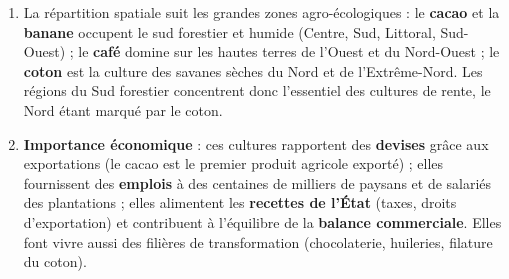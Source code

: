 \documentclass[11pt]{article}
\begin{document}
\begin{corrige}
\begin{enumerate}
\item La répartition spatiale suit les grandes zones agro-écologiques : le \textbf{cacao} et la \textbf{banane} occupent le sud forestier et humide (Centre, Sud, Littoral, Sud-Ouest) ; le \textbf{café} domine sur les hautes terres de l'Ouest et du Nord-Ouest ; le \textbf{coton} est la culture des savanes sèches du Nord et de l'Extrême-Nord. Les régions du Sud forestier concentrent donc l'essentiel des cultures de rente, le Nord étant marqué par le coton.
\item \textbf{Importance économique} : ces cultures rapportent des \textbf{devises} grâce aux exportations (le cacao est le premier produit agricole exporté) ; elles fournissent des \textbf{emplois} à des centaines de milliers de paysans et de salariés des plantations ; elles alimentent les \textbf{recettes de l'État} (taxes, droits d'exportation) et contribuent à l'équilibre de la \textbf{balance commerciale}. Elles font vivre aussi des filières de transformation (chocolaterie, huileries, filature du coton).
\end{enumerate}
\end{corrige}
\end{document}
